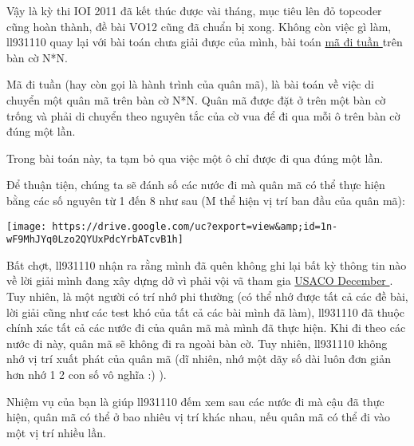 Vậy là kỳ thi IOI 2011 đã kết thúc được vài tháng, mục tiêu lên đỏ topcoder cũng hoàn thành, đề bài VO12 cũng đã chuẩn bị xong. Không còn việc gì làm, ll931110 quay lại với bài toán chưa giải được của mình, bài toán \href{http://en.wikipedia.org/wiki/Knights_tour}{ mã đi tuần } trên bàn cờ N*N.

Mã đi tuần (hay còn gọi là hành trình của quân mã), là bài toán về việc di chuyển một quân mã trên bàn cờ N*N. Quân mã được đặt ở trên một bàn cờ trống và phải di chuyển theo nguyên tắc của cờ vua để đi qua mỗi ô trên bàn cờ đúng một lần.

Trong bài toán này, ta tạm bỏ qua việc một ô chỉ được đi qua đúng một lần.

Để thuận tiện, chúng ta sẽ đánh số các nước đi mà quân mã có thể thực hiện bằng các số nguyên từ 1 đến 8 như sau (M thể hiện vị trí ban đầu của quân mã):


\texttt{[image: https://drive.google.com/uc?export=view\&amp;id=1n-wF9MhJYq0Lzo2QYUxPdcYrbATcvB1h]}

Bất chợt, ll931110 nhận ra rằng mình đã quên không ghi lại bất kỳ thông tin nào về lời giải mình đang xây dựng dở vì phải vội vã tham gia \href{http://www.usaco.org/current/data/dec11_gold_results.html}{ USACO December } . Tuy nhiên, là một người có trí nhớ phi thường (có thể nhớ được tất cả các đề bài, lời giải cũng như các test khó của tất cả các bài mình đã làm), ll931110 đã thuộc chính xác tất cả các nước đi của quân mã mà mình đã thực hiện. Khi đi theo các nước đi này, quân mã sẽ không đi ra ngoài bàn cờ. Tuy nhiên, ll931110 không nhớ vị trí xuất phát của quân mã (dĩ nhiên, nhớ một dãy số dài luôn đơn giản hơn nhớ 1 2 con số vô nghĩa :) ).

Nhiệm vụ của bạn là giúp ll931110 đếm xem sau các nước đi mà cậu đã thực hiện, quân mã có thể ở bao nhiêu vị trí khác nhau, nếu quân mã có thể đi vào một vị trí nhiều lần.

\